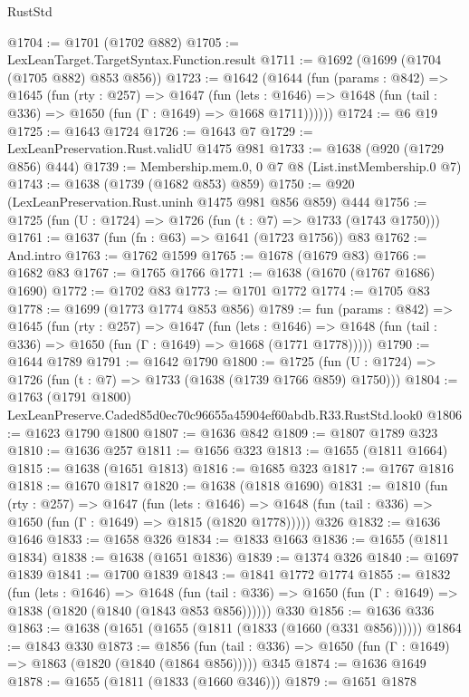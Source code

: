 \begin{lexlean}{RustStd}
\begin{coremodule}
@1704 := @1701 (@1702 @882)
@1705 := LexLeanTarget.TargetSyntax.Function.result
@1711 := @1692 (@1699 (@1704 (@1705 @882) @853 @856))
@1723 := @1642
    (@1644
      (fun (params : @842) =>
      @1645
        (fun (rty : @257) =>
        @1647
          (fun (lets : @1646) =>
          @1648 (fun (tail : @336) => @1650 (fun (Γ : @1649) => @1668 @1711))))))
@1724 := @6 @19
@1725 := @1643 @1724
@1726 := @1643 @7
@1729 := LexLeanPreservation.Rust.validU @1475 @981
@1733 := @1638 (@920 (@1729 @856) @444)
@1739 := Membership.mem.{0, 0} @7 @8 (List.instMembership.{0} @7)
@1743 := @1638 (@1739 (@1682 @853) @859)
@1750 := @920 (LexLeanPreservation.Rust.uninh @1475 @981 @856 @859) @444
@1756 := @1725 (fun (U : @1724) => @1726 (fun (t : @7) => @1733 (@1743 @1750)))
@1761 := @1637 (fun (fn : @63) => @1641 (@1723 @1756)) @83
@1762 := And.intro
@1763 := @1762 @1599
@1765 := @1678 (@1679 @83)
@1766 := @1682 @83
@1767 := @1765 @1766
@1771 := @1638 (@1670 (@1767 @1686) @1690)
@1772 := @1702 @83
@1773 := @1701 @1772
@1774 := @1705 @83
@1778 := @1699 (@1773 @1774 @853 @856)
@1789 := fun (params : @842) =>
  @1645
    (fun (rty : @257) =>
    @1647
      (fun (lets : @1646) =>
      @1648 (fun (tail : @336) => @1650 (fun (Γ : @1649) => @1668 (@1771 @1778)))))
@1790 := @1644 @1789
@1791 := @1642 @1790
@1800 := @1725 (fun (U : @1724) => @1726 (fun (t : @7) => @1733 (@1638 (@1739 @1766 @859) @1750)))
@1804 := @1763 (@1791 @1800) LexLeanPreserve.Caded85d0ec70c96655a45904ef60abdb.R33.RustStd.look0
@1806 := @1623 @1790 @1800
@1807 := @1636 @842
@1809 := @1807 @1789 @323
@1810 := @1636 @257
@1811 := @1656 @323
@1813 := @1655 (@1811 @1664)
@1815 := @1638 (@1651 @1813)
@1816 := @1685 @323
@1817 := @1767 @1816
@1818 := @1670 @1817
@1820 := @1638 (@1818 @1690)
@1831 := @1810
    (fun (rty : @257) =>
    @1647
      (fun (lets : @1646) =>
      @1648 (fun (tail : @336) => @1650 (fun (Γ : @1649) => @1815 (@1820 @1778)))))
    @326
@1832 := @1636 @1646
@1833 := @1658 @326
@1834 := @1833 @1663
@1836 := @1655 (@1811 @1834)
@1838 := @1638 (@1651 @1836)
@1839 := @1374 @326
@1840 := @1697 @1839
@1841 := @1700 @1839
@1843 := @1841 @1772 @1774
@1855 := @1832
    (fun (lets : @1646) =>
    @1648 (fun (tail : @336) => @1650 (fun (Γ : @1649) => @1838 (@1820 (@1840 (@1843 @853 @856))))))
    @330
@1856 := @1636 @336
@1863 := @1638 (@1651 (@1655 (@1811 (@1833 (@1660 (@331 @856))))))
@1864 := @1843 @330
@1873 := @1856
    (fun (tail : @336) => @1650 (fun (Γ : @1649) => @1863 (@1820 (@1840 (@1864 @856)))))
    @345
@1874 := @1636 @1649
@1878 := @1655 (@1811 (@1833 (@1660 @346)))
@1879 := @1651 @1878

\end{coremodule}
\end{lexlean}
